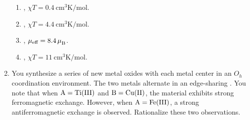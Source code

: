 \documentclass[../psets.tex]{subfiles}
\begin{document}
\begin{enumerate}
    \begin{enumerate}
        \item {}, $\chi T=\SI{0.4}{\centi\meter\cubed\kelvin\per\mole}$.
        \item {}, $\chi T=\SI{4.4}{\centi\meter\cubed\kelvin\per\mole}$.
        \item {}, $\mu_\text{eff}=8.4\,{\mu_\text{B}^{}}$.
        \item {}, $\chi T=\SI{11}{\centi\meter\cubed\kelvin\per\mole}$.
    \end{enumerate}
    \item You synthesize a series of new metal oxides with each metal center in an $O_h$ coordination environment. The two metals alternate in an edge-sharing . You note that when $\ce{A}=\ce{Ti(III)}$ and $\ce{B}=\ce{Cu(II)}$, the material exhibits strong ferromagnetic exchange. However, when $\ce{A}=\ce{Fe(III)}$, a strong antiferromagnetic exchange is observed. Rationalize these two observations.
\end{enumerate}
\end{document}
